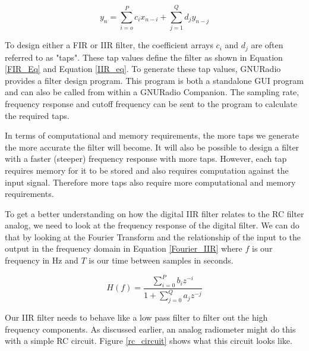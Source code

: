 \begin{equation}\label{IIR_eq}
y_n=\displaystyle\sum\limits_{i=o}^{P} c_ix_{n-i}+\displaystyle\sum\limits_{j=1}^{Q} d_jy_{n-j}
\end{equation}

To design either a FIR or IIR filter, the coefficient arrays $c_i$ and $d_j$ are often referred to as "taps".  These tap values define the filter as shown in Equation \ref{FIR_Eq} and Equation \ref{IIR_eq}.  To generate these tap values, GNURadio provides a filter design program.  This program is both a standalone GUI program and can also be called from within a GNURadio Companion.  The sampling rate, frequency response and cutoff frequency can be sent to the program to calculate the required taps.  

In terms of computational and memory requirements, the more taps we generate the more accurate the filter will become.  It will also be possible to design a filter with a faster (steeper) frequency response with more taps.  However, each tap requires memory for it to be stored and also requires computation against the input signal.  Therefore more taps also require more computational and memory requirements.  


To get a better understanding on how the digital IIR filter relates to the RC filter analog, we need to look at the frequency response of the digital filter.  We can do that by looking at the Fourier Transform and the relationship of the input to the output in the frequency domain in Equation \ref{Fourier_IIR} where $f$ is our frequency in Hz and $T$ is our time between samples in seconds.  

\begin{equation}\label{Fourier_IIR}
H(f)=\frac{\displaystyle\sum\limits_{i=0}^{P} b_i z^{-i}}{1+\displaystyle\sum\limits_{j=0}^{Q} a_j z^{-j}}
\end{equation}

Our IIR filter needs to behave like a low pass filter to filter out the high frequency components.  As discussed earlier, an analog radiometer might do this with a simple RC circuit.  Figure \ref{rc_circuit} shows what this circuit looks like.

